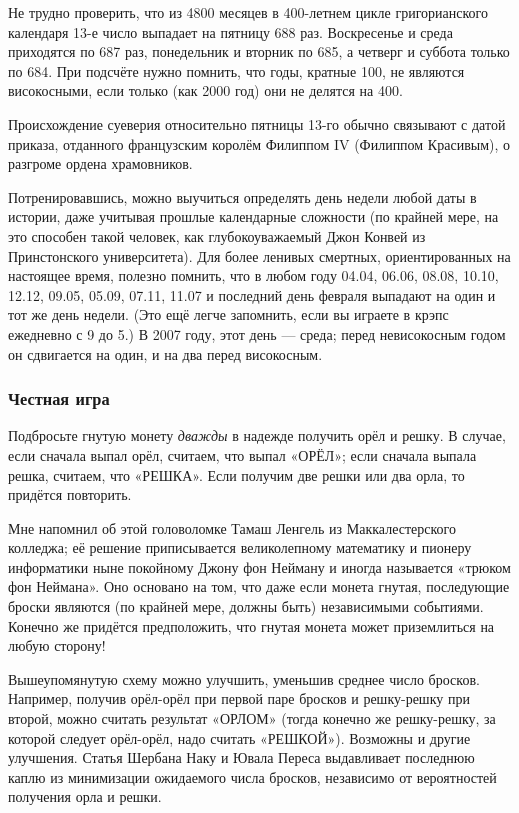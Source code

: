 Не трудно проверить, что из 4800 месяцев в 400-летнем цикле григорианского календаря 13-е число выпадает на пятницу 688 раз.
Воскресенье и среда приходятся по 687 раз, понедельник и вторник по 685, а четверг и суббота только по 684.
При подсчёте нужно помнить, что годы, кратные 100, не являются високосными, если только (как 2000 год) они не делятся на 400.

Происхождение суеверия относительно пятницы 13-го обычно связывают с датой приказа, отданного французским королём Филиппом IV (Филиппом Красивым), о разгроме ордена храмовников.

Потренировавшись, можно выучиться определять день недели любой даты в истории, даже учитывая прошлые календарные сложности
(по крайней мере, на это способен такой человек, как глубокоуважаемый Джон Конвей из Принстонского университета).
Для более ленивых смертных, ориентированных на настоящее время, полезно помнить, что в любом году
04.04, 06.06, 08.08, 10.10, 12.12, 09.05, 05.09, 07.11, 11.07 и последний день февраля выпадают на один и тот же день недели.
(Это ещё легче запомнить, если вы играете в крэпс ежедневно с 9 до 5.)
В 2007 году, этот день --- среда;
перед невисокосным годом он сдвигается на один, и на два перед високосным.

\subsubsection*{Честная игра}

Подбросьте гнутую монету \emph{дважды} в надежде получить орёл и решку.
В случае, если сначала выпал орёл, считаем, что выпал «ОРЁЛ»;
если сначала выпала решка, считаем, что «РЕШКА».
Если получим две решки или два орла, то придётся повторить.

Мне напомнил об этой головоломке Тамаш Ленгель из Маккалестерского колледжа;
её решение приписывается великолепному математику и пионеру информатики ныне покойному Джону фон Нейману и иногда называется «трюком фон Неймана».
Оно основано на том, что даже если монета гнутая, последующие броски являются (по крайней мере, должны быть) независимыми событиями.
Конечно же придётся предположить, что гнутая монета может приземлиться на любую сторону!

Вышеупомянутую схему можно улучшить, уменьшив среднее число бросков.
Например, получив орёл-орёл при первой паре бросков и решку-решку при второй, можно считать результат «ОРЛОМ» (тогда конечно же решку-решку, за которой следует орёл-орёл, надо считать «РЕШКОЙ»).
Возможны и другие улучшения.
Статья Шербана Наку и Ювала Переса \cite{44} выдавливает последнюю каплю из минимизации ожидаемого числа бросков, независимо от вероятностей получения орла и решки.

